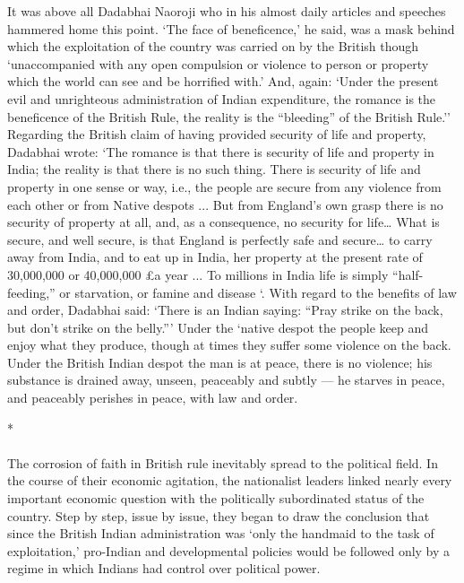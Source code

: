 \begin{multicols}{2}
It was above all Dadabhai Naoroji who in his almost daily articles and speeches hammered home this point. `The face of beneficence,' he said, was a mask behind which the exploitation of the country was carried on by the British though `unaccompanied with any open compulsion or violence to person or property which the world can see and be horrified with.' And, again: `Under the present evil and unrighteous administration of Indian expenditure, the romance is the beneficence of the British Rule, the reality is the ``bleeding'' of the British Rule.'' Regarding the British claim of having provided security of life and property, Dadabhai wrote: `The romance is that there is security of life and property in India; the reality is that there is no such thing. There is security of life and property in one sense or way, i.e., the people are secure from any violence from each other or from Native despots ... But from England's own grasp there is no security of property at all, and, as a consequence, no security for life… What is secure, and well secure, is that England is perfectly safe and secure… to carry away from India, and to eat up in India, her property at the present rate of 30,000,000 or 40,000,000 \pounds a year ... To millions in India life is simply ``half-feeding,'' or starvation, or famine and disease `. With regard to the benefits of law and order, Dadabhai said: `There is an Indian saying: ``Pray strike on the back, but don't strike on the belly.''' Under the `native despot the people keep and enjoy what they produce, though at times they suffer some violence on the back. Under the British Indian despot the man is at peace, there is no violence; his substance is drained away, unseen, peaceably and subtly --- he starves in peace, and peaceably perishes in peace, with law and order.

\begin{center}*\end{center}

\paragraph*{}

The corrosion of faith in British rule inevitably spread to the political field. In the course of their economic agitation, the nationalist leaders linked nearly every important economic question with the politically subordinated status of the country. Step by step, issue by issue, they began to draw the conclusion that since the British Indian administration was `only the handmaid to the task of exploitation,' pro-Indian and developmental policies would be followed only by a regime in which Indians had control over political power.


\end{multicols}
